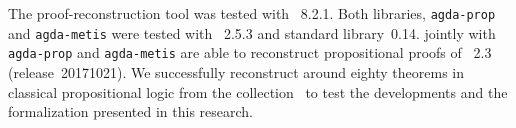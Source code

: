 \documentclass[../main.tex]{subfiles}
\begin{document}
The proof-reconstruction tool \Athena was tested with ~8.2.1.
Both libraries, \verb!agda-prop! and \verb!agda-metis! were tested with
\Agda~2.5.3 and \Agda standard library~0.14.
\Athena jointly with \verb!agda-prop! and \verb!agda-metis! are able to reconstruct propositional proofs of \Metis~2.3 (release~20171021).
We successfully reconstruct around eighty theorems in classical propositional
logic from the \TPTP collection~\cite{Prieto-Cubides2017} to test
the developments and the formalization presented in this research.
\end{document}
